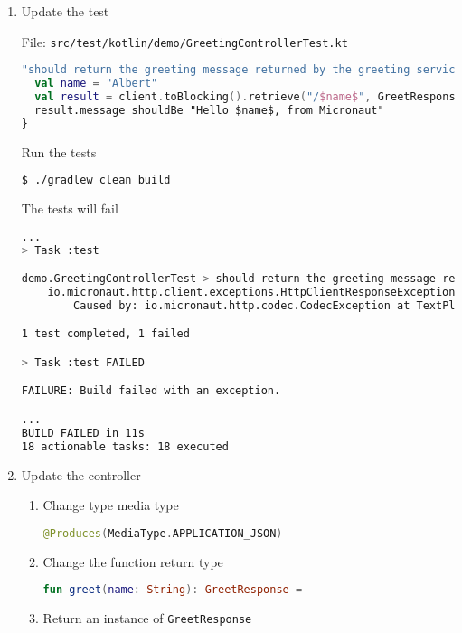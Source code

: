 \begin{enumerate}
\item Update the test

File: \texttt{src/test/kotlin/demo/GreetingControllerTest.kt}
\begin{lstlisting}[language=Kotlin]
"should return the greeting message returned by the greeting service" {
  val name = "Albert"
  val result = client.toBlocking().retrieve("/$name$", GreetResponse::class.java)
  result.message shouldBe "Hello $name$, from Micronaut"
}
\end{lstlisting}

Run the tests

\begin{lstlisting}[language=bash]
$ ./gradlew clean build
\end{lstlisting}

The tests will fail

\begin{lstlisting}[language=bash]
...
> Task :test

demo.GreetingControllerTest > should return the greeting message returned by the greeting service FAILED
    io.micronaut.http.client.exceptions.HttpClientResponseException at DefaultHttpClient.java:2075
        Caused by: io.micronaut.http.codec.CodecException at TextPlainCodec.java:95

1 test completed, 1 failed

> Task :test FAILED

FAILURE: Build failed with an exception.

...
BUILD FAILED in 11s
18 actionable tasks: 18 executed
\end{lstlisting}

\item Update the controller

\begin{enumerate}

\item Change type media type

\begin{lstlisting}[language=Kotlin]
@Produces(MediaType.APPLICATION_JSON)
\end{lstlisting}

\item Change the function return type

\begin{lstlisting}[language=Kotlin]
fun greet(name: String): GreetResponse =
\end{lstlisting}

\item Return an instance of \texttt{GreetResponse}


\end{enumerate}
\end{enumerate}
